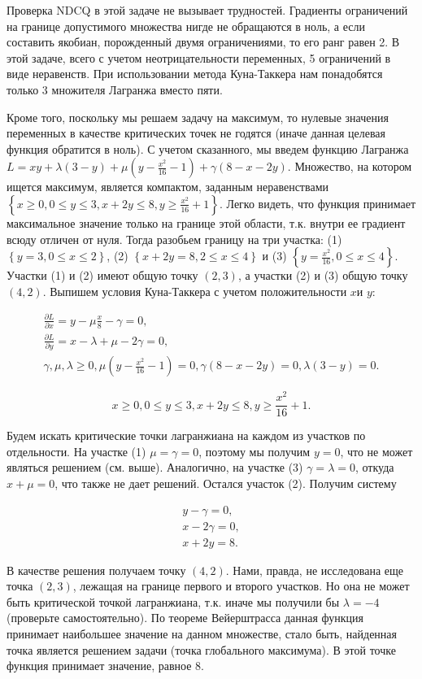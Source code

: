\begin{solution}
Проверка NDCQ в этой задаче не вызывает трудностей. Градиенты ограничений на границе допустимого множества нигде не обращаются в ноль, а если составить якобиан, порожденный двумя ограничениями, то его ранг равен 2. В этой задаче, всего с учетом неотрицательности переменных, 5 ограничений в виде неравенств. При использовании метода Куна-Таккера нам понадобятся только 3 множителя Лагранжа  вместо пяти. 


Кроме того, поскольку мы решаем задачу на максимум, то нулевые значения переменных в качестве критических точек не годятся (иначе данная целевая функция обратится в ноль). С учетом сказанного, мы введем функцию Лагранжа $L=xy+\lambda (3-y)+\mu (y-\frac{x^{2} }{16} -1)+\gamma (8-x-2y)$. Множество, на котором ищется максимум, является компактом, заданным неравенствами $\left\{\right. x\ge 0,  0\le y\le 3,  x+2y\le 8,  y\ge \frac{x^{2} }{16} +1\left. \right\}$. Легко видеть, что функция принимает максимальное значение только на границе этой области, т.к. внутри ее градиент всюду отличен от нуля. Тогда разобьем границу на три участка: (1) $\left\{y=3,  0\le x\le 2\right\}$, (2) $\left\{x+2y=8,  2\le x\le 4\right\}$ и (3) $\left\{y=\frac{x^{2} }{16} ,  0\le x\le 4\right\}$. Участки (1) и (2) имеют общую точку $(2,3)$, а участки (2) и (3) общую точку $(4,2)$. Выпишем условия Куна-Таккера с учетом положительности $x$и $y$:

\[\begin{array}{l} {\frac{\partial L}{\partial x} =y-\mu \frac{x}{8} -\gamma =0,} \\ {\frac{\partial L}{\partial y} =x-\lambda +\mu -2\gamma =0,} \\ {\gamma ,\mu ,\lambda \ge 0,  \mu (y-\frac{x^{2} }{16} -1)=0,  \gamma (8-x-2y)=0,  \lambda (3-y)=0.} \end{array}\] 

\[x\ge 0,  0\le y\le 3,  x+2y\le 8,  y\ge \frac{x^{2} }{16} +1.\] 

Будем искать критические точки лагранжиана на каждом из участков по отдельности. На участке (1) $\mu =\gamma =0$, поэтому мы получим $y=0$, что не может являться решением (см. выше). Аналогично, на участке (3)  $\gamma =\lambda =0$, откуда $x+\mu =0$, что также не дает решений. Остался участок (2).  Получим систему

\[\begin{array}{l} {y-\gamma =0,} \\ {x-2\gamma =0,} \\ {x+2y=8.} \end{array}\] 

В качестве решения получаем точку $(4,2)$. Нами, правда, не исследована еще точка $(2,3)$, лежащая на границе первого и второго участков. Но она не может быть критической точкой лагранжиана, т.к. иначе мы получили бы $\lambda =-4$ (проверьте самостоятельно). По теореме Вейерштрасса данная функция принимает наибольшее значение на данном множестве, стало быть, найденная точка является решением задачи (точка глобального максимума). В этой точке функция принимает значение, равное 8.
\end{solution}

